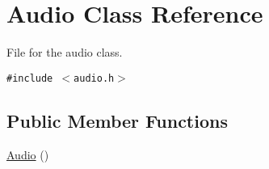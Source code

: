 \hypertarget{class_audio}{
\section{Audio Class Reference}
\label{class_audio}
}
File for the audio class.  


{\tt \#include $<$audio.h$>$}

\subsection*{Public Member Functions}
\begin{CompactItemize}
\item 
\hypertarget{class_audio_a9d3935a2b91ab4b825bc0cb05f245ea}{
\hyperlink{class_audio_a9d3935a2b91ab4b825bc0cb05f245ea}{Audio} ()}
\label{class_audio_a9d3935a2b91ab4b825bc0cb05f245ea}


\end{CompactItemize}
